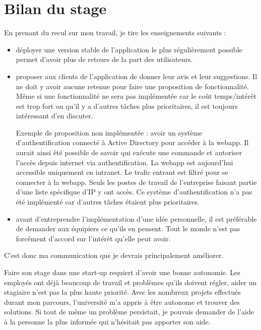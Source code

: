 
\chapter{Bilan du stage}
En prenant du recul sur mon travail, je tire les enseignements suivants :
\begin{itemize}
  \item[\textbullet] déployer une version stable de l'application le plus
    régulièrement possible permet d'avoir plus de retours de la part des
    utilisateurs.

  \item[\textbullet] proposer aux clients de l'application de donner leur avis et leur
    suggestions. Il ne doit y avoir aucune retenue pour faire une proposition
    de fonctionnalité. Même si une fonctionnalité ne sera pas implémentée car le
    coût temps/intérêt est trop fort ou qu'il y a d'autres tâches plus
    prioritaires, il est toujours intéressant d'en discuter.

    Exemple de proposition non implémentée : avoir un système d'authentification
    connecté à Active Directory pour accéder à la webapp. Il aurait ainsi été
    possible de savoir qui exécute une commande et autoriser l'accès depuis
    internet via authentification. La webapp est aujourd'hui accessible
    uniquement en intranet.
    Le trafic entrant est filtré pour se connecter à la webapp. Seuls les postes
    de travail de l'entreprise faisant partie d'une liste spécifique d'IP y ont accès.
    Ce système d'authentification n'a pas été implémenté car d'autres tâches
    étaient plus prioritaires.

  \item[\textbullet] avant d'entreprendre l'implémentation d'une idée personnelle, il est
    préférable de demander aux équipiers ce qu'ils en pensent. Tout le monde
    n'est pas forcément d'accord sur l'intérêt qu'elle peut avoir.
\end{itemize}
C'est donc ma communication que je devrais principalement améliorer.

Faire son stage dans une start-up requiert d'avoir une bonne autonomie.
Les employés ont déjà beaucoup de travail et problèmes qu'ils doivent régler,
aider un stagiaire n'est pas la plus haute priorité. Avec les nombreux projets
effectués durant mon parcours, l'université m'a appris à être autonome et
trouver des solutions. Si tout de même un problème persistait, je pouvais
demander de l'aide à la personne la plus informée qui n'hésitait pas apporter
son aide.

